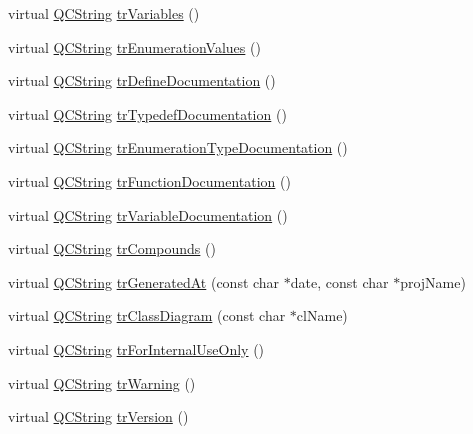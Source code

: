 \begin{DoxyCompactItemize}
\item 
virtual \hyperlink{class_q_c_string}{Q\+C\+String} \hyperlink{class_translator_serbian_aa2b3c902f5f87ceb7823df3fa6e142bc}{tr\+Variables} ()
\item 
virtual \hyperlink{class_q_c_string}{Q\+C\+String} \hyperlink{class_translator_serbian_a2f2df06b1746143ec0f381b9ae735c93}{tr\+Enumeration\+Values} ()
\item 
virtual \hyperlink{class_q_c_string}{Q\+C\+String} \hyperlink{class_translator_serbian_a515e7bec0c6c96323c9abd1ded9dc95a}{tr\+Define\+Documentation} ()
\item 
virtual \hyperlink{class_q_c_string}{Q\+C\+String} \hyperlink{class_translator_serbian_a6062bcd75e680969a4389945e4917211}{tr\+Typedef\+Documentation} ()
\item 
virtual \hyperlink{class_q_c_string}{Q\+C\+String} \hyperlink{class_translator_serbian_ad717a37c47bbcad3fc268aefdd52c62e}{tr\+Enumeration\+Type\+Documentation} ()
\item 
virtual \hyperlink{class_q_c_string}{Q\+C\+String} \hyperlink{class_translator_serbian_ad6dadfab3a0cfc54e1a9289ad6028f32}{tr\+Function\+Documentation} ()
\item 
virtual \hyperlink{class_q_c_string}{Q\+C\+String} \hyperlink{class_translator_serbian_aa9a9dc092958f35036de0d798cc2c1c5}{tr\+Variable\+Documentation} ()
\item 
virtual \hyperlink{class_q_c_string}{Q\+C\+String} \hyperlink{class_translator_serbian_a4df1c98ea3db8b76b56e8f83e6f73dae}{tr\+Compounds} ()
\item 
virtual \hyperlink{class_q_c_string}{Q\+C\+String} \hyperlink{class_translator_serbian_ada82dcd457ba18a45a3c779cf49f0d2c}{tr\+Generated\+At} (const char $\ast$date, const char $\ast$proj\+Name)
\item 
virtual \hyperlink{class_q_c_string}{Q\+C\+String} \hyperlink{class_translator_serbian_aea8f2fc9a71e37d9e953c973337c75b0}{tr\+Class\+Diagram} (const char $\ast$cl\+Name)
\item 
virtual \hyperlink{class_q_c_string}{Q\+C\+String} \hyperlink{class_translator_serbian_ab4d2ee55ef897328ca28e3072297abb1}{tr\+For\+Internal\+Use\+Only} ()
\item 
virtual \hyperlink{class_q_c_string}{Q\+C\+String} \hyperlink{class_translator_serbian_a96f06c7c38cded55d672fdde1207d737}{tr\+Warning} ()
\item 
virtual \hyperlink{class_q_c_string}{Q\+C\+String} \hyperlink{class_translator_serbian_ad6c80c2106b594399e9e20133e591a19}{tr\+Version} ()

\end{DoxyCompactItemize}
